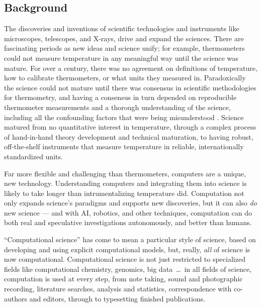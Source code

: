 \documentclass{comjnl}
\begin{document}
\begin{change}
\section{Background}
The discoveries and inventions of scientific technologies and instruments like microscopes, telescopes, and X-rays, drive and expand the sciences. There are fascinating periods as new ideas and science unify; for example, thermometers could not measure temperature in any meaningful way until the science was mature. For over a century, there was no agreement on definitions of temperature, how to calibrate thermometers, or what units they measured in. Paradoxically the science could not mature until there was consensus in scientific methodologies for thermometry, and having a consensus in turn depended on reproducible thermometer measurements and a thorough understanding of the science, including all the confounding factors that were being misunderstood \cite{temperature}. %
Science matured from no quantitative interest in temperature, through a complex process of hand-in-hand theory development and technical maturation, to having robust, off-the-shelf instruments that measure temperature in reliable, internationally standardized units.

Far more flexible and challenging than thermometers, computers are a unique, new technology. Understanding computers and integrating them into science is likely to take longer than intrumentalizing temperature did. Computation not only expands science's paradigms and supports new discoveries, but it can also \emph{do\/} new science --- and with AI, robotics, and other techniques, computation can do both real and speculative investigations autonomously, and better than humans. 

``Computational science'' has come to mean a particular style of science, based on developing and using explicit computational models, but, really, \emph{all\/} of science is now computational. Computational science is not just restricted to specialized fields like computational chemistry, genomics, big data~\ldots\ in all fields of science, computation is used at every step, from note taking, sound and photographic recording, literature searches, analysis and statistics, correspondence with co-authors and editors, through to typesetting finished publications. 


\end{change}
\end{document}
